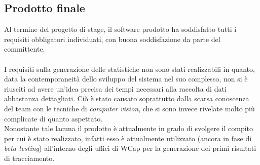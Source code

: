 \subsection{Prodotto finale}
Al termine del progetto di stage, il software prodotto ha soddisfatto tutti i requisiti obbligatori individuati, con buona soddisfazione da parte del committente. \\ \\
I requisiti sulla generazione delle statistiche non sono stati realizzabili in quanto, data la contemporaneità dello sviluppo del sistema nel suo complesso, non si è riusciti ad avere un'idea precisa dei tempi necessari alla raccolta di dati abbastanza dettagliati. Ciò è stato causato soprattutto dalla scarsa conoscenza del team con le tecniche di \textit{computer vision}, che si sono invece rivelate molto più complicate di quanto aspettato. \\
Nonostante tale lacuna il prodotto è attualmente in grado di svolgere il compito per cui è stato realizzato, infatti esso è attualmente utilizzato (ancora in fase di \textit{beta testing}) all'interno degli uffici di WCap per la generazione dei primi risultati di tracciamento.

